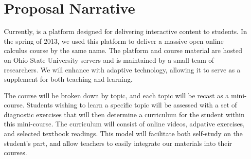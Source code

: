 \section{Proposal Narrative}


%
%
%
%
%
%
%




Currently, \mooculus is a platform designed for delivering interactive
content to students. In the spring of 2013, we used this platform to
deliver a massive open online calculus course by the same name. The
platform and course material are hosted on Ohio State University
servers and is maintained by a small team of researchers. We will
enhance \mooculus with adaptive technology, allowing it to serve as a
supplement for both teaching and learning.


The course will be broken down by topic, and each topic will be recast
as a mini-course. Students wishing to learn a specific topic will be
assessed with a set of diagnostic exercises that will then determine a
curriculum for the student within this mini-course. The curriculum
will consist of online videos, adpative exercises, and selected
textbook readings. This model will facilitate both self-study on the
student's part, and allow teachers to easily integrate our materials
into their courses.

